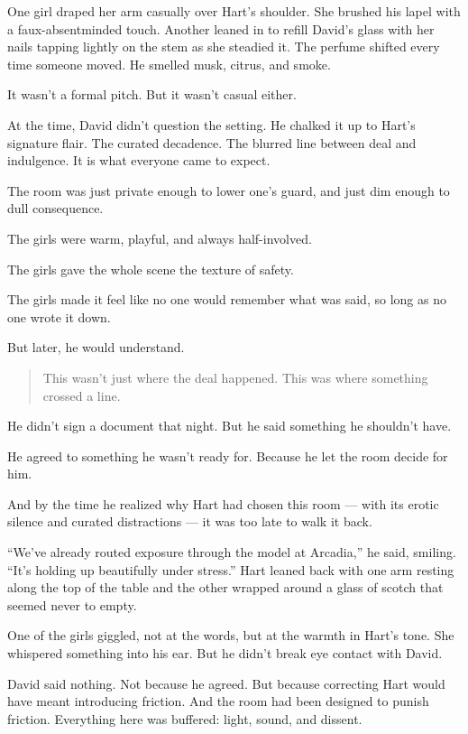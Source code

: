 \medskip


One girl draped her arm casually over Hart’s shoulder. She brushed his lapel with a faux-absentminded touch.  
Another leaned in to refill David’s glass with her nails tapping lightly on the stem as she steadied it.  
The perfume shifted every time someone moved. He smelled musk, citrus, and smoke.  

It wasn’t a formal pitch. But it wasn’t casual either.

At the time, David didn’t question the setting.  
He chalked it up to Hart’s signature flair. The curated decadence. The blurred line between deal and indulgence.
It is what everyone came to expect.  

The room was just private enough to lower one’s guard, and just dim enough to dull consequence.  

The girls were warm, playful, and always half-involved. 

The girls gave the whole scene the texture of safety.  

The girls made it feel like no one would remember what was said, so long as no one wrote it down.

But later, he would understand.

\begin{quote}

This wasn’t just where the deal happened.
This was where something crossed a line.

\end{quote}

He didn’t sign a document that night.  
But he said something he shouldn’t have.  

He agreed to something he wasn’t ready for.  
Because he let the room decide for him.

And by the time he realized why Hart had chosen this room ---
with its erotic silence and curated distractions ---  
it was too late to walk it back.

“We’ve already routed exposure through the model at Arcadia,” he said, smiling. 
“It’s holding up beautifully under stress.”
Hart leaned back with one arm resting along the top of the table and the other wrapped around a 
glass of scotch that seemed never to empty. 

One of the girls giggled, not at the words, but at the warmth in Hart’s tone. She whispered something into his ear. 
But he didn’t break eye contact with David.

David said nothing. Not because he agreed. But because correcting Hart would have meant introducing friction. And the 
room had been designed to punish friction. Everything here was buffered: light, sound, and dissent.

